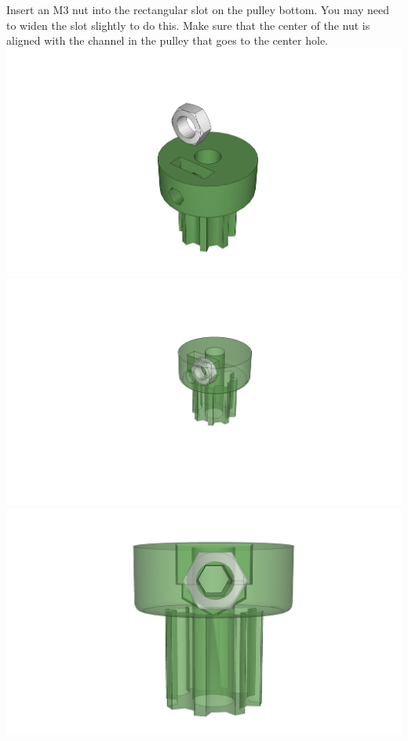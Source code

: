 \documentclass[twoside,a4paper,titlepage]{memoir}
\begin{document}
	\section{}
	Insert an M3 nut into the rectangular slot on the pulley bottom. You may need to widen the slot slightly
	to do this. Make sure that the center of the nut is aligned with the channel in the pulley that goes to the
	center hole.\\
	\includegraphics[width=1\linewidth]{graphics/ch6_14_1.png}
	\includegraphics[width=1\linewidth]{graphics/ch6_14_2.png}
	\includegraphics[width=1\linewidth]{graphics/ch6_14_3.png}
	
\end{document}
